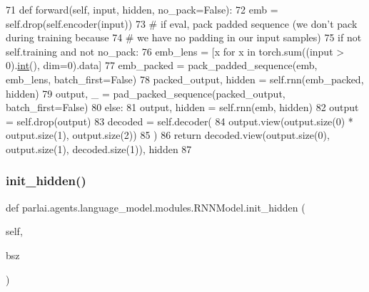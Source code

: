 \begin{DoxyCode}
71     \textcolor{keyword}{def }forward(self, input, hidden, no\_pack=False):
72         emb = self.drop(self.encoder(input))
73         \textcolor{comment}{# if eval, pack padded sequence (we don't pack during training because}
74         \textcolor{comment}{# we have no padding in our input samples)}
75         \textcolor{keywordflow}{if} \textcolor{keywordflow}{not} self.training \textcolor{keywordflow}{and} \textcolor{keywordflow}{not} no\_pack:
76             emb\_lens = [x \textcolor{keywordflow}{for} x \textcolor{keywordflow}{in} torch.sum((input > 0).\hyperlink{namespacelanguage__model_1_1eval__ppl_a7d12ee00479673c5c8d1f6d01faa272a}{int}(), dim=0).data]
77             emb\_packed = pack\_padded\_sequence(emb, emb\_lens, batch\_first=\textcolor{keyword}{False})
78             packed\_output, hidden = self.rnn(emb\_packed, hidden)
79             output, \_ = pad\_packed\_sequence(packed\_output, batch\_first=\textcolor{keyword}{False})
80         \textcolor{keywordflow}{else}:
81             output, hidden = self.rnn(emb, hidden)
82         output = self.drop(output)
83         decoded = self.decoder(
84             output.view(output.size(0) * output.size(1), output.size(2))
85         )
86         \textcolor{keywordflow}{return} decoded.view(output.size(0), output.size(1), decoded.size(1)), hidden
87 
\end{DoxyCode}
\mbox{\label{classparlai_1_1agents_1_1language__model_1_1modules_1_1RNNModel_a5221545da5d46cb54bb2ab4d80246c35}} 
\subsubsection{\texorpdfstring{init\+\_\+hidden()}{init\_hidden()}}
{\footnotesize\ttfamily def parlai.\+agents.\+language\+\_\+model.\+modules.\+R\+N\+N\+Model.\+init\+\_\+hidden (\begin{DoxyParamCaption}\item[{}]{self,  }\item[{}]{bsz }\end{DoxyParamCaption})}



